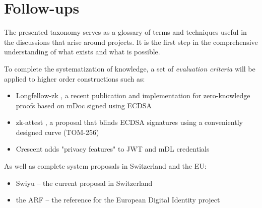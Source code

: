 \section{Follow-ups}
\label{sec:follow-up}

The presented taxonomy serves as a glossary of terms and techniques useful in the discussions that arise around \eid{} projects. It is the first step in the comprehensive understanding of what exists and what is possible. 

To complete the systematization of knowledge, a set of \emph{evaluation criteria} will be applied to higher order constructions such as:

\begin{itemize}
    \item Longfellow-zk \cite{FS24}, a recent publication and implementation for zero-knowledge proofs based on mDoc signed using ECDSA
    \item zk-attest \cite{zkattest-rs}, a proposal that blinds ECDSA signatures using a conveniently designed curve (TOM-256)
    \item Crescent \cite{FFL25} adds "privacy features" to JWT and mDL credentials
\end{itemize}

As well as complete system proposals in Switzerland and the EU:

\begin{itemize}
    \item Swiyu \cite{Swiyu} -- the current \eid{} proposal in Switzerland
    \item the ARF \cite{EUDI-ARF} -- the reference for the European Digital Identity project
\end{itemize}

